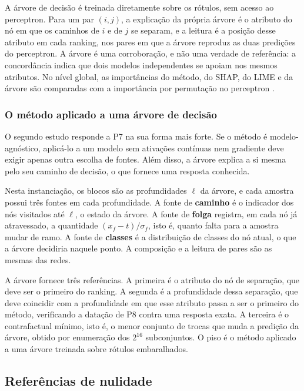 A árvore de decisão \citep{Breiman1984} é treinada diretamente sobre os rótulos, sem acesso ao perceptron. Para um par $(i,j)$, a explicação da própria árvore é o atributo do nó em que os caminhos de $i$ e de $j$ se separam, e a leitura é a posição desse atributo em cada ranking, nos pares em que a árvore reproduz as duas predições do perceptron. A árvore é uma corroboração, e não uma verdade de referência: a concordância indica que dois modelos independentes se apoiam nos mesmos atributos. No nível global, as importâncias do método, do SHAP, do LIME e da árvore são comparadas com a importância por permutação no perceptron \citep{Breiman2001}.

\subsubsection*{O método aplicado a uma árvore de decisão}

O segundo estudo responde a P7 na sua forma mais forte. Se o método é modelo-agnóstico, aplicá-lo a um modelo sem ativações contínuas nem gradiente deve exigir apenas outra escolha de fontes. Além disso, a árvore explica a si mesma pelo seu caminho de decisão, o que fornece uma resposta conhecida.

Nesta instanciação, os blocos são as profundidades $\ell$ da árvore, e cada amostra possui três fontes em cada profundidade. A fonte de \textbf{caminho} é o indicador dos nós visitados até $\ell$, o estado da árvore. A fonte de \textbf{folga} registra, em cada nó já atravessado, a quantidade $(x_f - t)/\sigma_f$, isto é, quanto falta para a amostra mudar de ramo. A fonte de \textbf{classes} é a distribuição de classes do nó atual, o que a árvore decidiria naquele ponto. A composição e a leitura de pares são as mesmas das redes.

A árvore fornece três referências. A primeira é o atributo do nó de separação, que deve ser o primeiro do ranking. A segunda é a profundidade dessa separação, que deve coincidir com a profundidade em que esse atributo passa a ser o primeiro do método, verificando a datação de P8 contra uma resposta exata. A terceira é o contrafactual mínimo, isto é, o menor conjunto de trocas que muda a predição da árvore, obtido por enumeração dos $2^{16}$ subconjuntos. O piso é o método aplicado a uma árvore treinada sobre rótulos embaralhados.

\subsection{Referências de nulidade}\label{subsec:pisos}

